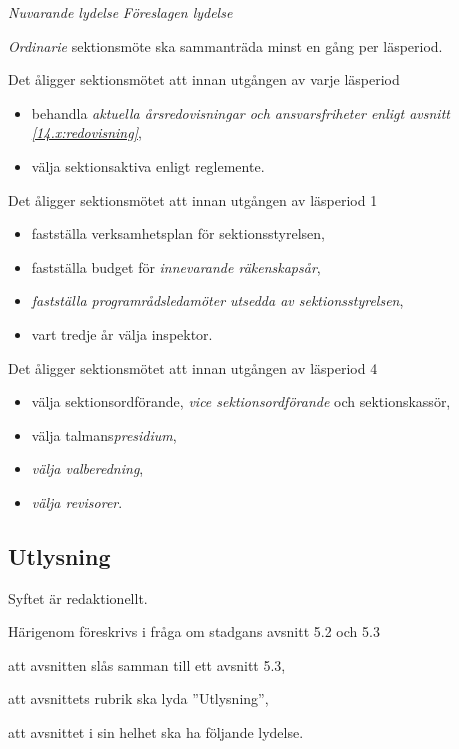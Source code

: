 \documentclass{article}
\newenvironment{lydelse}
    {\begin{paracol}{2}%
        \emph{Nuvarande lydelse}%
        \switchcolumn%
        \emph{Föreslagen lydelse}%
    \end{paracol}%
    \begin{enumerate}[label=\thesubsection.\arabic*]%
    \begin{paracol}{2}%
    }{\end{paracol}\end{enumerate}}
\begin{document}
\begin{lydelse}
  \switchcolumn
  \setcounter{subsection}{2}

  \item \emph{Ordinarie} sektionsmöte ska sammanträda minst en gång per läsperiod.

  \item Det åligger sektionsmötet att innan utgången av varje läsperiod
  \begin{itemize}
    \item behandla \emph{aktuella årsredovisningar och ansvarsfriheter enligt avsnitt \ref{14.x:redovisning}},
    \item välja sektionsaktiva enligt reglemente.
  \end{itemize}

  \item Det åligger sektionsmötet att innan utgången av läsperiod 1
  \begin{itemize}
    \item fastställa verksamhetsplan för sektionsstyrelsen,
    \item fastställa budget för \emph{innevarande räkenskapsår},
    \item \emph{fastställa programrådsledamöter utsedda av sektionsstyrelsen},
    \item vart tredje år välja inspektor.
  \end{itemize}

  \item Det åligger sektionsmötet att innan utgången av läsperiod 4
  \label{S:SektmoteLP4Alagg}
  \begin{itemize}
    \item välja sektionsordförande, \emph{vice sektionsordförande} och sektionskassör,
    \item välja talmans\emph{presidium},
    \item \emph{välja valberedning},
    \item \emph{välja revisorer}.
  \end{itemize}
\end{lydelse}

\setcounter{subsection}{2}
\subsection{Utlysning} \label{5.2:utlysning}
Syftet är redaktionellt.

Härigenom föreskrivs i fråga om stadgans avsnitt 5.2 och 5.3
\begin{dels}
\item att avsnitten slås samman till ett avsnitt 5.3,
\item att avsnittets rubrik ska lyda ''Utlysning'',
\item att avsnittet i sin helhet ska ha följande lydelse.
\end{dels}
\end{document}
